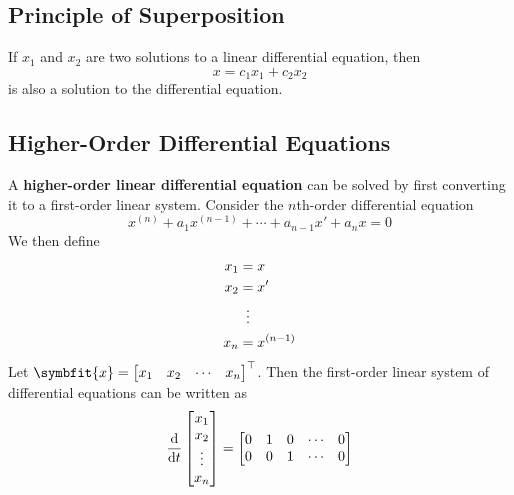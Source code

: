 \documentclass{article}
\begin{document}
\subsection{Principle of Superposition}
\begin{theorem}
    If \(x_1\) and \(x_2\) are two solutions to a linear differential
    equation, then
    \begin{equation*}
        x = c_1 x_1 + c_2 x_2
    \end{equation*}
    is also a solution to the differential equation.
\end{theorem}
\subsection{Higher-Order Differential Equations}
\begin{theorem}
    A \textbf{higher-order linear differential equation} can be solved
    by first converting it to a first-order linear system. Consider the
    \(n\)th-order differential equation
    \begin{equation*}
        x^{\left( n \right)} + a_1 x^{\left( n-1 \right)} + \cdots + a_{n-1} x' + a_n x = 0
    \end{equation*}
    We then define
    \begin{align*}
        x_1 & = x                      \\
        x_2 & = x'                     \\
            & \vdotswithin{=}          \\
        x_n & = x^{\left( n-1 \right)}
    \end{align*}
    Let \(\symbfit{x}=
    \begin{bmatrix}
        x_1 & x_2 & \cdots & x_n
    \end{bmatrix}^\top
    \). Then the first-order linear system of differential equations can
    be written as
    \begin{equation*}
        \dv{t}
        \begin{bmatrix}
            x_1               \\
            x_2               \\
            \vdotswithin{x_3} \\
            x_n
        \end{bmatrix}
        =
        \begin{bmatrix}
            0      & 1        & 0        & \cdots & 0      \\
            0      & 0        & 1        & \cdots & 0      \\

\end{bmatrix}
\end{equation*}
\end{theorem}
\end{document}
